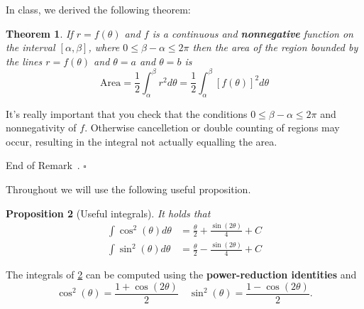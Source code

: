 \documentclass[10pt]{article}
\newtheorem{theorem}{Theorem}
\newtheorem{proposition}[theorem]{Proposition}
\newtheorem{remark}[theorem]{Remark}
\theoremstyle{definition}
\renewenvironment{remark}
{\begin{oldremark}} 
  {\par\smallskip\hfill   End of Remark~\theremark. $\square$    \par\end{oldremark}}
\newcommand{\1}[1]{\textbf{1}_{\left[#1\right]}} %
\begin{document}
In class, we derived the following theorem:

\begin{theorem}\label{thm:polar-area-theorem}
  If $r=f(\theta)$ and $f$ is a continuous and \textbf{nonnegative} function on the interval $[\alpha,\beta]$, where $0
  \leq \beta-\alpha \leq 2\pi$ then the area of the region bounded by the
  lines $r =f(\theta)$ and $\theta=a$ and $\theta = b$ is
  \begin{equation*}
    \text{Area} = \frac{1}{2}\int_{\alpha}^{\beta}r^{2}d\theta =  \frac{1}{2} \int_{\alpha}^{\beta}\left[ f(\theta) \right]^{2}d\theta   
  \end{equation*}
\end{theorem}
\begin{remark}
  It's really important that you check that the conditions $0 \leq \beta - \alpha \leq 2\pi$ and
  nonnegativity of $f$. Otherwise cancelletion or double counting of regions may occur, resulting in the
  integral not actually equalling the area.
\end{remark}

Throughout we will use the following useful proposition.

\begin{proposition}[Useful integrals]
  \label{prop:useful-integrals}
  It holds that
  \begin{align*}
    \int \cos^{2}(\theta)d\theta  &= \frac{\theta}{2}+\frac{\sin(2\theta)}{4}+C\\
    \int \sin^{2}(\theta)d\theta  &= \frac{\theta}{2}-\frac{\sin(2\theta)}{4}+C
  \end{align*}
\end{proposition}
The integrals of \cref{prop:useful-integrals} can be computed using the
\textbf{power-reduction identities} and
\begin{equation*}
  \cos^{2}(\theta) = \frac{1+\cos(2\theta)}{2} \quad \sin^{2}(\theta) = \frac{1-\cos(2\theta)}{2}.
\end{equation*}
\end{document}
